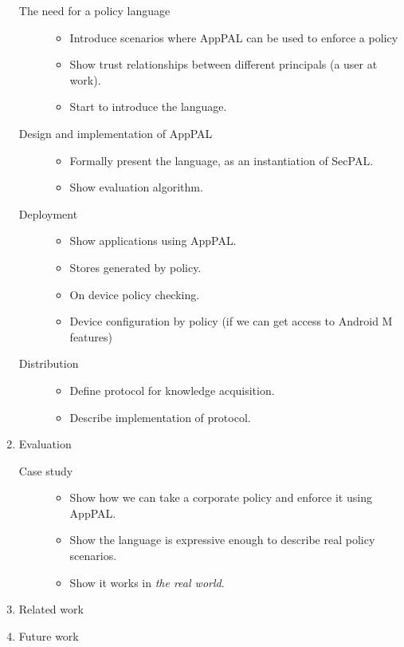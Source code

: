\documentclass[a4paper]{scrartcl}
\begin{document}
\begin{enumerate}
    \begin{description}
      \item[The need for a policy language]
        \hfill
        \begin{itemize}
          \item Introduce scenarios where AppPAL can be used to enforce a policy
          \item Show trust relationships between different principals (a user at work).
          \item Start to introduce the language.
        \end{itemize}
      \item[Design and implementation of AppPAL]
        \hfill
        \begin{itemize}
          \item Formally present the language, as an instantiation of SecPAL.
          \item Show evaluation algorithm.
        \end{itemize}
      \item[Deployment]
        \hfill
        \begin{itemize}
          \item Show applications using AppPAL.
          \item Stores generated by policy.
          \item On device policy checking.
          \item Device configuration by policy (if we can get access to Android M features)
        \end{itemize}
      \item[Distribution]
        \hfill
        \begin{itemize}
          \item Define protocol for knowledge acquisition.
          \item Describe implementation of protocol.
        \end{itemize}
    \end{description}
  \item Evaluation
    \begin{description}
      \item[Case study]
        \hfill
        \begin{itemize}
          \item Show how we can take a corporate policy and enforce it using AppPAL.
          \item Show the language is expressive enough to describe real policy scenarios.
          \item Show it works in \emph{the real world}.
        \end{itemize}
    \end{description}
  \item Related work
  \item Future work
\end{enumerate}



\newpage
\appendix
\end{document}
